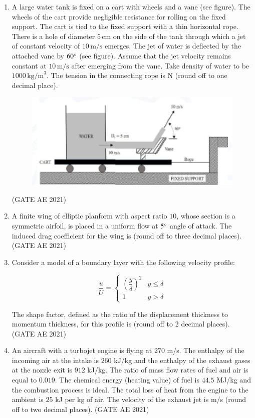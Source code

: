 \documentclass[journal,12pt,onecolumn]{IEEEtran}
\theoremstyle{remark}
\begin{document}
\begin{flushleft}
\begin{enumerate}
\item A large water tank is fixed on a cart with wheels and a vane (see figure). The wheels of the cart provide negligible resistance for rolling on the fixed support. The cart is tied to the fixed support with a thin horizontal rope. There is a hole of diameter $5\,\text{cm}$ on the side of the tank through which a jet of constant velocity of $10\,\text{m/s}$ emerges. The jet of water is deflected by the attached vane by $60\degree$ (see figure). Assume that the jet velocity remains constant at $10\,\text{m/s}$ after emerging from the vane. Take density of water to be $1000\,\text{kg/m}^{3}$. The tension in the connecting rope is \underline{\hspace{2cm}} N (round off to one decimal place).
\begin{figure}[H]
    \centering
    \includegraphics[width=0.5\columnwidth]{figs/fgfs.png}
    \caption{}
    \label{fig:placeholder}
\end{figure}
\hfill (GATE AE 2021)

\item 
A finite wing of elliptic planform with aspect ratio $10$, whose section is a symmetric airfoil, is placed in a uniform flow at $5\degree$ angle of attack. The induced drag coefficient for the wing is  \underline{\hspace{2cm}} (round off to three decimal places).
\hfill (GATE AE 2021)
\item 
Consider a model of a boundary layer with the following velocity profile:  

\[
\frac{u}{U} = 
\begin{cases} 
\left( \dfrac{y}{\delta} \right)^2 & y \leq \delta \\[6pt]
1 & y > \delta
\end{cases}
\]

The shape factor, defined as the ratio of the displacement thickness to momentum thickness, for this profile is \underline{\hfill} (round off to 2 decimal places).  
\hfill (GATE AE 2021)

\item 
An aircraft with a turbojet engine is flying at $270$ m/s. The enthalpy of the incoming air at the intake is $260$ kJ/kg and the enthalpy of the exhaust gases at the nozzle exit is $912$ kJ/kg. The ratio of mass flow rates of fuel and air is equal to $0.019$. The chemical energy (heating value) of fuel is $44.5$ MJ/kg and the combustion process is ideal. The total loss of heat from the engine to the ambient is $25$ kJ per kg of air. The velocity of the exhaust jet is \underline{\hfill} m/s (round off to two decimal places).  
\hfill (GATE AE 2021)


\end{enumerate}
\end{flushleft}
\end{document}
